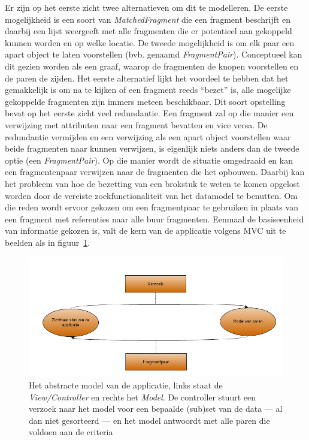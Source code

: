 Er zijn op het eerste zicht twee alternatieven om dit te modelleren. De eerste mogelijkheid is een soort van \emph{MatchedFragment} die een fragment beschrijft en daarbij een lijst weergeeft met alle fragmenten die er potentieel aan gekoppeld kunnen worden en op welke locatie. De tweede mogelijkheid is om elk paar een apart object te laten voorstellen (bvb. genaamd \emph{FragmentPair}). Conceptueel kan dit gezien worden als een graaf, waarop de fragmenten de knopen voorstellen en de paren de zijden. Het eerste alternatief lijkt het voordeel te hebben dat het gemakkelijk is om na te kijken of een fragment reeds ``bezet'' is, alle mogelijke gekoppelde fragmenten zijn immers meteen beschikbaar. Dit soort opstelling bevat op het eerste zicht veel redundantie. Een fragment zal op die manier een verwijzing met attributen naar een fragment bevatten en vice versa. De redundantie vermijden en een verwijzing als een apart object voorstellen waar beide fragmenten naar kunnen verwijzen, is eigenlijk niets anders dan de tweede optie (een \emph{FragmentPair}). Op die manier wordt de situatie omgedraaid en kan een fragmentenpaar verwijzen naar de fragmenten die het opbouwen. Daarbij kan het probleem van hoe de bezetting van een brokstuk te weten te komen opgelost worden door de vereiste zoekfunctionaliteit van het datamodel te benutten. Om die reden wordt ervoor gekozen om een fragmentpaar te gebruiken in plaats van een fragment met referenties naar alle buur fragmenten. Eenmaal de basiseenheid van informatie gekozen is, valt de kern van de applicatie volgens MVC uit te beelden als in figuur~\ref{fig:basicprogramflow}.\\

\begin{figure}[ht]
	\begin{center}
		\includegraphics[width=1.0\columnwidth]{images/BasicExecutionFlow.png}
		\caption{Het abstracte model van de applicatie, links staat de \emph{View/Controller} en rechts het \emph{Model}. De controller stuurt een verzoek naar het model voor een bepaalde (sub)set van de data --- al dan niet gesorteerd --- en het model antwoordt met alle paren die voldoen aan de criteria}
		\label{fig:basicprogramflow}
	\end{center}
\end{figure}

